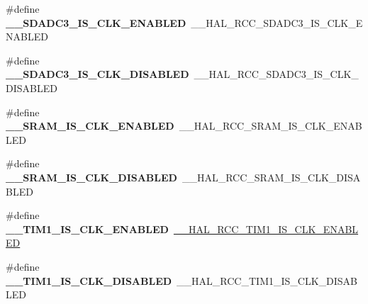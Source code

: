 \begin{DoxyCompactItemize}
\item 
\mbox{\label{group___h_a_l___r_c_c___aliased_ga41a9d65373a84607fc66101cb870a848}} 
\#define {\bfseries \+\_\+\+\_\+\+S\+D\+A\+D\+C3\+\_\+\+I\+S\+\_\+\+C\+L\+K\+\_\+\+E\+N\+A\+B\+L\+ED}~\+\_\+\+\_\+\+H\+A\+L\+\_\+\+R\+C\+C\+\_\+\+S\+D\+A\+D\+C3\+\_\+\+I\+S\+\_\+\+C\+L\+K\+\_\+\+E\+N\+A\+B\+L\+ED
\item 
\mbox{\label{group___h_a_l___r_c_c___aliased_ga730e65c79c630f9fcc26822a8935e5c3}} 
\#define {\bfseries \+\_\+\+\_\+\+S\+D\+A\+D\+C3\+\_\+\+I\+S\+\_\+\+C\+L\+K\+\_\+\+D\+I\+S\+A\+B\+L\+ED}~\+\_\+\+\_\+\+H\+A\+L\+\_\+\+R\+C\+C\+\_\+\+S\+D\+A\+D\+C3\+\_\+\+I\+S\+\_\+\+C\+L\+K\+\_\+\+D\+I\+S\+A\+B\+L\+ED
\item 
\mbox{\label{group___h_a_l___r_c_c___aliased_gaa705610d5a659ed552f87a6d6dc8af1a}} 
\#define {\bfseries \+\_\+\+\_\+\+S\+R\+A\+M\+\_\+\+I\+S\+\_\+\+C\+L\+K\+\_\+\+E\+N\+A\+B\+L\+ED}~\+\_\+\+\_\+\+H\+A\+L\+\_\+\+R\+C\+C\+\_\+\+S\+R\+A\+M\+\_\+\+I\+S\+\_\+\+C\+L\+K\+\_\+\+E\+N\+A\+B\+L\+ED
\item 
\mbox{\label{group___h_a_l___r_c_c___aliased_ga7b00de661df4e1dc8b36d9e1976b71a4}} 
\#define {\bfseries \+\_\+\+\_\+\+S\+R\+A\+M\+\_\+\+I\+S\+\_\+\+C\+L\+K\+\_\+\+D\+I\+S\+A\+B\+L\+ED}~\+\_\+\+\_\+\+H\+A\+L\+\_\+\+R\+C\+C\+\_\+\+S\+R\+A\+M\+\_\+\+I\+S\+\_\+\+C\+L\+K\+\_\+\+D\+I\+S\+A\+B\+L\+ED
\item 
\mbox{\label{group___h_a_l___r_c_c___aliased_ga6f1ed81157e63c93719376c7077e4784}} 
\#define {\bfseries \+\_\+\+\_\+\+T\+I\+M1\+\_\+\+I\+S\+\_\+\+C\+L\+K\+\_\+\+E\+N\+A\+B\+L\+ED}~\mbox{\hyperlink{group___r_c_c_ex___peripheral___clock___enable___disable___status_gad2b7c3a381d791c4ee728e303935832a}{\+\_\+\+\_\+\+H\+A\+L\+\_\+\+R\+C\+C\+\_\+\+T\+I\+M1\+\_\+\+I\+S\+\_\+\+C\+L\+K\+\_\+\+E\+N\+A\+B\+L\+ED}}
\item 
\mbox{\label{group___h_a_l___r_c_c___aliased_ga0105023c626e29aa2288e6e7d3cc524f}} 
\#define {\bfseries \+\_\+\+\_\+\+T\+I\+M1\+\_\+\+I\+S\+\_\+\+C\+L\+K\+\_\+\+D\+I\+S\+A\+B\+L\+ED}~\+\_\+\+\_\+\+H\+A\+L\+\_\+\+R\+C\+C\+\_\+\+T\+I\+M1\+\_\+\+I\+S\+\_\+\+C\+L\+K\+\_\+\+D\+I\+S\+A\+B\+L\+ED

\end{DoxyCompactItemize}
